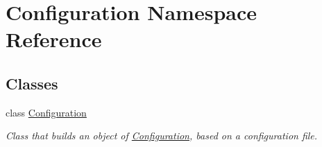 \hypertarget{namespace_configuration}{\section{Configuration Namespace Reference}
\label{namespace_configuration}
}
\subsection*{Classes}
\begin{DoxyCompactItemize}
\item 
class \hyperlink{class_configuration_1_1_configuration}{Configuration}
\begin{DoxyCompactList}\small\item\em Class that builds an object of \hyperlink{class_configuration_1_1_configuration}{Configuration}, based on a configuration file. \end{DoxyCompactList}\end{DoxyCompactItemize}
